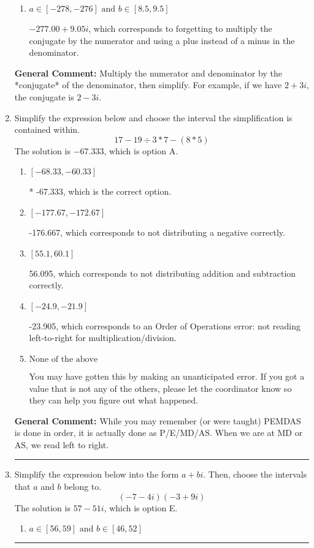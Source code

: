 \documentclass{extbook}[14pt]
\newcommand{\litem}[1]{\item #1

\rule{\textwidth}{0.4pt}}
\begin{document}
\begin{enumerate}
{\begin{enumerate}[label=\Alph*.]
 $8.08  + 6.10 i$, which corresponds to forgetting to multiply the conjugate by the numerator and not computing the conjugate correctly.
\item \( a \in [-278, -276] \text{ and } b \in [8.5, 9.5] \)

 $-277.00  + 9.05 i$, which corresponds to forgetting to multiply the conjugate by the numerator and using a plus instead of a minus in the denominator.
\end{enumerate}

\textbf{General Comment:} Multiply the numerator and denominator by the *conjugate* of the denominator, then simplify. For example, if we have $2+3i$, the conjugate is $2-3i$.
}
\litem{
Simplify the expression below and choose the interval the simplification is contained within.
\[ 17 - 19 \div 3 * 7 - (8 * 5) \]The solution is \( -67.333 \), which is option A.\begin{enumerate}[label=\Alph*.]
\item \( [-68.33, -60.33] \)

* -67.333, which is the correct option.
\item \( [-177.67, -172.67] \)

 -176.667, which corresponds to not distributing a negative correctly.
\item \( [55.1, 60.1] \)

 56.095, which corresponds to not distributing addition and subtraction correctly.
\item \( [-24.9, -21.9] \)

 -23.905, which corresponds to an Order of Operations error: not reading left-to-right for multiplication/division.
\item \( \text{None of the above} \)

 You may have gotten this by making an unanticipated error. If you got a value that is not any of the others, please let the coordinator know so they can help you figure out what happened.
\end{enumerate}

\textbf{General Comment:} While you may remember (or were taught) PEMDAS is done in order, it is actually done as P/E/MD/AS. When we are at MD or AS, we read left to right.
}
\litem{
Simplify the expression below into the form $a+bi$. Then, choose the intervals that $a$ and $b$ belong to.
\[ (-7 - 4 i)(-3 + 9 i) \]The solution is \( 57 - 51 i \), which is option E.\begin{enumerate}[label=\Alph*.]
\item \( a \in [56, 59] \text{ and } b \in [46, 52] \)


\end{enumerate}}
\end{enumerate}
\end{document}
